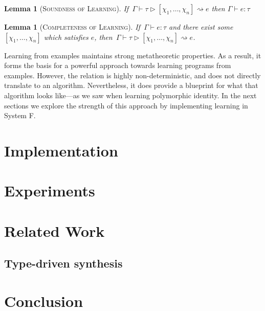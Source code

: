 \documentclass[sigplan,10pt]{acmart}
\theoremstyle{mytheoremstyle}
\newtheorem{lemma}[theorem]{Lemma}
\begin{document}
\begin{lemma}[\textsc{Soundness of Learning}]
If $\,\Gamma \vdash \tau \rhd [\chi_1,\dots,\chi_n] \rightsquigarrow e$ then $\Gamma \vdash e : \tau$
\label{soundness-learning-examples}
\end{lemma}

\begin{lemma}[\textsc{Completeness of Learning}]
If $\,\Gamma \vdash e : \tau$ and there exist some $[\chi_1,\dots,\chi_n]$ which satisfies $e$, then $\,\Gamma \vdash \tau \rhd [\chi_1,\dots,\chi_n] \rightsquigarrow e$.
\label{completeness-learning-examples-b}
\end{lemma}

Learning from examples maintains strong metatheoretic properties. As a result, it forms the basis for a powerful approach towards learning programs from examples. However, the relation is highly non-deterministic, and does not directly translate to an algorithm. Nevertheless, it does provide a blueprint for what that algorithm looks like---as we saw when learning polymorphic identity. In the next sections we explore the strength of this approach by implementing learning in System F.

\newpage
\section{Implementation}



\section{Experiments}


\section{Related Work}


\subsection{Type-driven synthesis}


\section{Conclusion}
\end{document}
